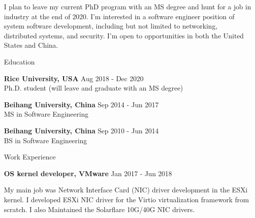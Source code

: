 \documentclass{resume} %
\begin{document}


I plan to leave my current PhD program with an MS degree and hunt for a job in industry
at the end of 2020.
I'm interested in a software engineer position of system software development,
including but not limited to networking, distributed systems, and security.
I'm open to opportunities in both the United States and China.


\begin{rSection}{Education}

{\bf Rice University, USA} \hfill { Aug 2018 - Dec 2020}
\\ Ph.D. student (will leave and graduate with an MS degree)

{\bf Beihang University, China} \hfill { Sep 2014 - Jun 2017}
\\ MS in Software Engineering

{\bf Beihang University, China} \hfill { Sep 2010 - Jun 2014}
\\ BS in Software Engineering

\end{rSection}



\begin{rSection}{Work Experience}

\item {\bf OS kernel developer, VMware} \hfill { Jan 2017 - Jun 2018}

My main job was Network Interface Card (NIC) driver development in the
ESXi kernel.
I developed ESXi NIC driver for the Virtio virtualization framework from
scratch.
I also Maintained the Solarflare 10G/40G NIC drivers.

\vspace{2mm}

\end{rSection}
\end{document}
